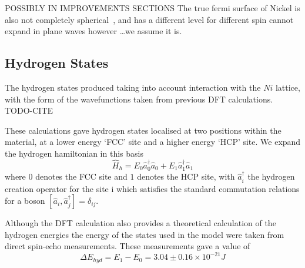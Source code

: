 POSSIBLY IN IMPROVEMENTS SECTIONS
The true fermi surface
of Nickel is also not completely
spherical~\cite{FermiSufaceNickel},
and has a different level for different spin
cannot expand in plane waves
however \ldots we assume it is.

\subsection{Hydrogen States}
The hydrogen states produced
taking into account interaction with
the \(Ni\) lattice, with the form
of the wavefunctions taken
from previous DFT calculations. TODO-CITE

These calculations gave hydrogen
states localised at two positions
within the material, at a lower energy
`FCC' site and a higher energy
`HCP' site. We expand the hydrogen
hamiltonian in this basis
\begin{equation}
  \hat{H}_{h} =
  E_0 \hat{a}^\dagger_0 \hat{a}_0
  + E_1 \hat{a}^\dagger_1 \hat{a}_1
\end{equation}
where \(0\) denotes the FCC site and \(1\)
denotes the HCP site,
with \(\hat{a}^\dagger_i\) the hydrogen creation
operator for the site i
which satisfies the standard commutation
relations for a boson
\(\left[ \hat{a}_i, \hat{a}^\dagger_j \right]
= \delta_{ij}\).

Although the DFT calculation
also provides a theoretical calculation
of the hydrogen energies the
energy of the states used in the
model were
taken from direct spin-echo measurements.
These measurements gave a value of
\begin{equation}
  \Delta{}E_{hyd} = E_1 - E_0
  = 3.04\pm0.16\times{}10^{-21} J
  \label{eqn:hydrogen energy difference}
\end{equation}


